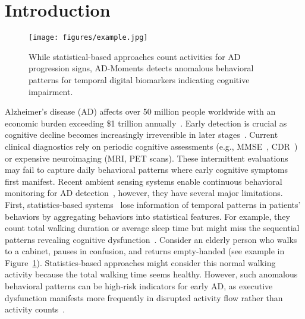 \documentclass[sigconf, anonymous, 9pt, nonacm]{acmart}
\newcommand{\sys}{AD-Moments\xspace}
\begin{document}
\section{Introduction}
\label{sec:intro}

\begin{figure}[t]
\centering
\texttt{[image: figures/example.jpg]}
\caption{While statistical-based approaches count activities for AD progression signs, \sys detects anomalous behavioral patterns for temporal digital biomarkers indicating cognitive impairment.}
\label{fig:example}
\vspace{-2.1em}
\end{figure}

Alzheimer's disease (AD) affects over 50 million people worldwide with an economic burden exceeding \$1 trillion annually~\cite{WHO2024,ADI2024}. Early detection is crucial as cognitive decline becomes increasingly irreversible in later stages~\cite{Rasmussen2019EarlyDiagnosis,Porsteinsson2021Diagnosis}. Current clinical diagnostics rely on periodic cognitive assessments (e.g., MMSE~\cite{Folstein1975_MMSE}, CDR~\cite{Hughes1982_CDR}) or expensive neuroimaging (MRI, PET scans).
These intermittent evaluations may fail to capture daily behavioral patterns where early cognitive symptoms first manifest.
Recent ambient sensing systems enable continuous behavioral monitoring for AD detection~\cite{Boyle2025Activity}, however, they have several major limitations. First, 
statistics-based systems~\cite{ouyang2024ADMarker} lose  information of temporal patterns in patients' behaviors by aggregating behaviors into statistical features.
For example, they count total walking duration or average sleep time but might miss the sequential patterns revealing cognitive dysfunction~\cite{Grammatikopoulou2024SmartHomeAD}. Consider an elderly person who walks to a cabinet, pauses in confusion, and returns empty-handed (see example in Figure~\ref{fig:example}). 
Statistics-based approaches might consider this normal walking activity because the total walking time seems healthy. 
However, such anomalous behavioral patterns can be high-risk indicators for early AD, as executive dysfunction manifests more frequently in disrupted activity flow rather than activity counts~\cite{Rasmussen2019EarlyDiagnosis,kirova2015working,guarino2019executive}. 
\end{document}

